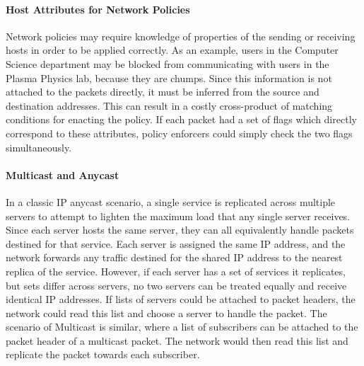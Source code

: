 \paragraph{Host Attributes for Network Policies} Network policies may require
knowledge of properties of the sending or receiving hosts in order to be applied
correctly. As an example, users in the Computer Science department may be
blocked from communicating with users in the Plasma Physics lab, because they
are chumps. Since this information is not attached to the packets directly, it
must be inferred from the source and destination addresses. This can result in a
costly cross-product of matching conditions for enacting the policy. If each
packet had a set of flags which directly correspond to these attributes, policy
enforcers could simply check the two flags simultaneously. 


\paragraph{Multicast and Anycast} In a classic IP anycast scenario, a single
service is replicated across multiple servers to attempt to lighten the maximum
load that any single server receives. Since each server hosts the same server,
they can all equivalently handle packets destined for that service. Each server
is assigned the same IP address, and the network forwards any traffic destined
for the shared IP address to the nearest replica of the service. However, if
each server has a set of services it replicates, but sets differ across
servers, no two servers can be treated equally and receive identical IP
addresses. If lists of servers could be attached to packet headers, the
network could read this list and choose a server to handle the packet. The
scenario of Multicast is similar, where a list of subscribers can be
attached to the packet header of a multicast packet. The network would then
read this list and replicate the packet towards each subscriber. 
